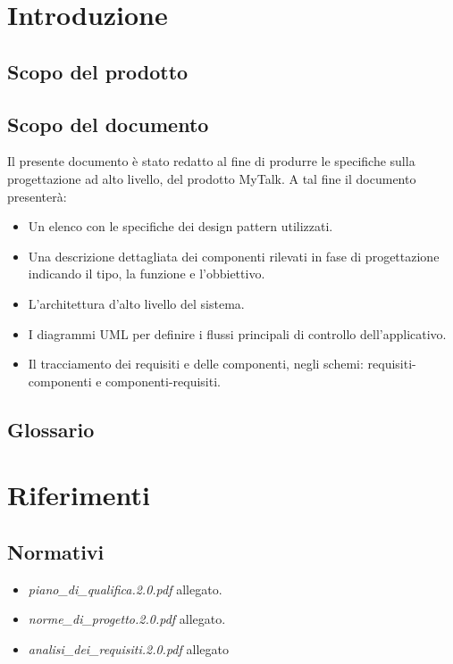 

\setcounter{page}{1}
\pagestyle{normal}


\newpage

\section{Introduzione}
\subsection{Scopo del prodotto}
\purpose

\subsection{Scopo del documento}
Il presente documento è stato redatto al fine di produrre le specifiche sulla progettazione ad alto livello, del prodotto MyTalk. A tal fine il documento presenterà:

\begin{itemize}
	\item Un elenco con le specifiche dei design pattern utilizzati.
	\item Una descrizione dettagliata dei componenti rilevati in fase di progettazione indicando il tipo,
la funzione e l'obbiettivo.
	\item L'architettura d'alto livello del sistema.
	\item I diagrammi UML per definire i flussi principali di controllo dell'applicativo.
	\item Il tracciamento dei requisiti e delle componenti, negli schemi: requisiti-componenti e componenti-requisiti.
\end{itemize}

\subsection{Glossario}
\glossaryIntro

\clearpage
\section{Riferimenti}

\subsection{Normativi}
\begin{itemize}
\item[] \textit{piano\_di\_qualifica.2.0.pdf} allegato.
\item[] \textit{norme\_di\_progetto.2.0.pdf} allegato.
\item[] \textit{analisi\_dei\_requisiti.2.0.pdf} allegato
\end{itemize}

